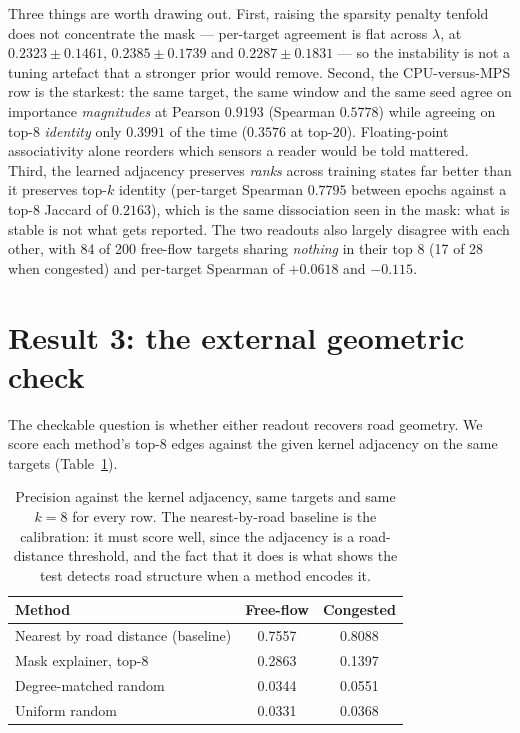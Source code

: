 \documentclass{article}
\begin{document}
Three things are worth drawing out. First, raising the sparsity penalty tenfold does
not concentrate the mask --- per-target agreement is flat across $\lambda$, at
$0.2323 \pm 0.1461$, $0.2385 \pm 0.1739$ and $0.2287 \pm 0.1831$ --- so the
instability is not a tuning artefact that a stronger prior would remove. Second, the
CPU-versus-MPS row is the starkest: the same target, the same window and the same
seed agree on importance \emph{magnitudes} at Pearson $0.9193$ (Spearman $0.5778$)
while agreeing on top-8 \emph{identity} only $0.3991$ of the time ($0.3576$ at
top-20). Floating-point associativity alone reorders which sensors a reader would be
told mattered. Third, the learned adjacency preserves \emph{ranks} across training
states far better than it preserves top-$k$ identity (per-target Spearman $0.7795$
between epochs against a top-8 Jaccard of $0.2163$), which is the same dissociation
seen in the mask: what is stable is not what gets reported. The two readouts also
largely disagree with each other, with 84 of 200 free-flow targets sharing
\emph{nothing} in their top 8 (17 of 28 when congested) and per-target Spearman of
$+0.0618$ and $-0.115$.

\section{Result 3: the external geometric check}

The checkable question is whether either readout recovers road geometry. We score
each method's top-8 edges against the given kernel adjacency on the same targets
(Table~\ref{tab:geometry}).

\begin{table}[h]
\centering
\caption{Precision against the kernel adjacency, same targets and same $k{=}8$ for
every row. The nearest-by-road baseline is the calibration: it must score well, since
the adjacency is a road-distance threshold, and the fact that it does is what shows
the test detects road structure when a method encodes it.}
\label{tab:geometry}
\small
\begin{tabular}{lcc}
\toprule
Method & Free-flow & Congested \\
\midrule
Nearest by road distance (baseline) & 0.7557 & 0.8088 \\
Mask explainer, top-8                & 0.2863 & 0.1397 \\
Degree-matched random                & 0.0344 & 0.0551 \\
Uniform random                       & 0.0331 & 0.0368 \\
\bottomrule
\end{tabular}
\end{table}
\end{document}
